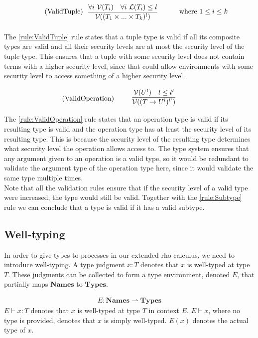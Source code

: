 \begin{align*}
    \tag{ValidTuple}\label{rule:ValidTuple} &\infrule{\forall i\ \valid{T_i}\quad \forall i\ \level{T_i}\leq l}{\valid{(T_1 \times...\times T_k)^l}}& \text{where}\ 1\leq i\leq k
\end{align*}
The \ref{rule:ValidTuple} rule states that a tuple type is valid if all its composite types are valid and all their security levels are at most the security level of the tuple type.
This ensures that a tuple with some security level does not contain terms with a higher security level, since that could allow environments with some security level to access something of a higher security level.

\begin{align*}
    \tag{ValidOperation}\label{rule:ValidOperation} &\infrule{\valid{U^l}\quad l\leq l'}{\valid{(T\ra U^l)^{l'}}}
\end{align*}
The \ref{rule:ValidOperation} rule states that an operation type is valid if its resulting type is valid and the operation type has at least the security level of its resulting type.
This is because the security level of the resulting type determines what security level the operation allows access to.
The type system ensures that any argument given to an operation is a valid type, so it would be redundant to validate the argument type of the operation type here, since it would validate the same type multiple times.\\

Note that all the validation rules ensure that if the security level of a valid type were increased, the type would still be valid. Together with the \ref{rule:Subtype} rule we can conclude that a type is valid if it has a valid subtype.

\subsection{Well-typing}
In order to give types to processes in our extended rho-calculus, we need to introduce well-typing.
A type judgment $x:T$ denotes that $x$ is well-typed at type $T$.
These judgments can be collected to form a type environment, denoted $E$, that partially maps $\mathbf{Names}$ to $\mathbf{Types}$.

\begin{align*}
    E: \mathbf{Names} \rightharpoonup \mathbf{Types}
\end{align*}
$E\vdash x:T$ denotes that $x$ is well-typed at type $T$ in context $E$.
$E\vdash x$, where no type is provided, denotes that $x$ is simply well-typed.
$E(x)$ denotes the actual type of $x$.

